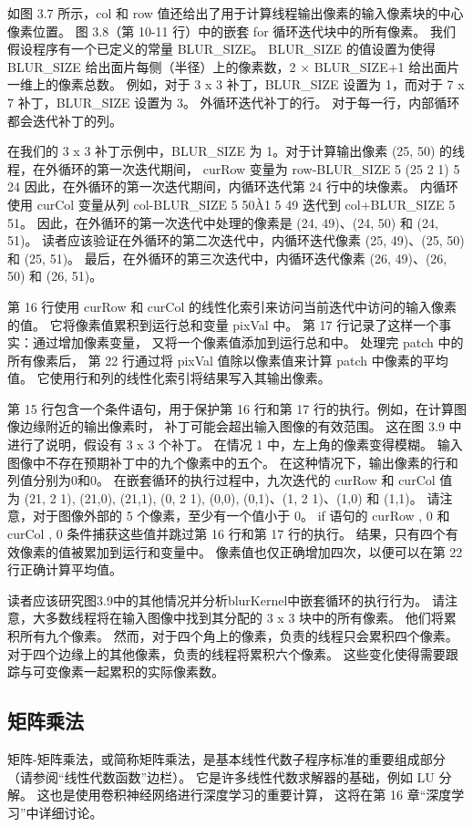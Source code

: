 如图 3.7 所示，col 和 row 值还给出了用于计算线程输出像素的输入像素块的中心像素位置。 
图 3.8（第 10-11 行）中的嵌套 for 循环迭代块中的所有像素。 我们假设程序有一个已定义的常量 BLUR\_SIZE。 
BLUR\_SIZE 的值设置为使得 BLUR\_SIZE 给出面片每侧（半径）上的像素数，2 × BLUR\_SIZE+1 给出面片一维上的像素总数。 
例如，对于 3 x 3 补丁，BLUR\_SIZE 设置为 1，而对于 7 x 7 补丁，BLUR\_SIZE 设置为 3。
外循环迭代补丁的行。 对于每一行，内部循环都会迭代补丁的列。

在我们的 3 x 3 补丁示例中，BLUR\_SIZE 为 1。对于计算输出像素 (25, 50) 的线程，在外循环的第一次迭代期间，
curRow 变量为 row-BLUR\_SIZE 5 (25 2 1) 5 24 因此，在外循环的第一次迭代期间，内循环迭代第 24 行中的块像素。
内循环使用 curCol 变量从列 col-BLUR\_SIZE 5 50À1 5 49 迭代到 col+BLUR\_SIZE 5 51。 
因此，在外循环的第一次迭代中处理的像素是 (24, 49)、(24, 50) 和 (24, 51)。 
读者应该验证在外循环的第二次迭代中，内循环迭代像素 (25, 49)、(25, 50) 和 (25, 51)。 
最后，在外循环的第三次迭代中，内循环迭代像素 (26, 49)、(26, 50) 和 (26, 51)。

第 16 行使用 curRow 和 curCol 的线性化索引来访问当前迭代中访问的输入像素的值。 
它将像素值累积到运行总和变量 pixVal 中。 第 17 行记录了这样一个事实：通过增加像素变量，
又将一个像素值添加到运行总和中。 处理完 patch 中的所有像素后，
第 22 行通过将 pixVal 值除以像素值来计算 patch 中像素的平均值。 它使用行和列的线性化索引将结果写入其输出像素。

第 15 行包含一个条件语句，用于保护第 16 行和第 17 行的执行。例如，在计算图像边缘附近的输出像素时，
补丁可能会超出输入图像的有效范围。 这在图 3.9 中进行了说明，假设有 3 x 3 个补丁。 在情况 1 中，左上角的像素变得模糊。 
输入图像中不存在预期补丁中的九个像素中的五个。 在这种情况下，输出像素的行和列值分别为0和0。 
在嵌套循环的执行过程中，九次迭代的 curRow 和 curCol 值
为 (21, 2 1), (21,0), (21,1), (0, 2 1), (0,0), (0,1)、(1, 2 1)、(1,0) 和 (1,1)。 
请注意，对于图像外部的 5 个像素，至少有一个值小于 0。 if 语句的 curRow , 0 和 curCol , 
0 条件捕获这些值并跳过第 16 行和第 17 行的执行。 结果，只有四个有效像素的值被累加到运行和变量中。 
像素值也仅正确增加四次，以便可以在第 22 行正确计算平均值。

读者应该研究图3.9中的其他情况并分析blurKernel中嵌套循环的执行行为。 
请注意，大多数线程将在输入图像中找到其分配的 3 x 3 块中的所有像素。 他们将累积所有九个像素。 
然而，对于四个角上的像素，负责的线程只会累积四个像素。 对于四个边缘上的其他像素，负责的线程将累积六个像素。 
这些变化使得需要跟踪与可变像素一起累积的实际像素数。

\subsection{矩阵乘法}
矩阵-矩阵乘法，或简称矩阵乘法，是基本线性代数子程序标准的重要组成部分（请参阅“线性代数函数”边栏）。 
它是许多线性代数求解器的基础，例如 LU 分解。 这也是使用卷积神经网络进行深度学习的重要计算，
这将在第 16 章“深度学习”中详细讨论。

